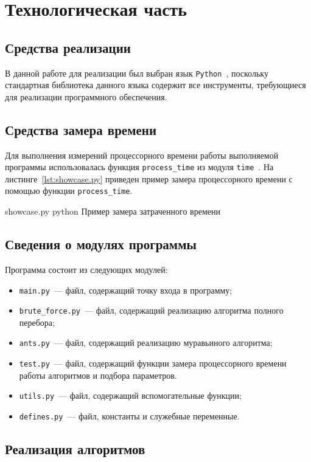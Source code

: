 \chapter{Технологическая часть}

\section{Средства реализации}

В данной работе для реализации был выбран язык \texttt{Python}~\cite{python-lang}, поскольку стандартная библиотека данного языка содержит все инструменты, требующиеся для реализации программного обеспечения.

\section{Средства замера времени}

Для выполнения измерений процессорного времени работы выполняемой программы использовалась функция \texttt{process\_time} из модуля \texttt{time}~\cite{python-lang-time}.
На листинге~\ref{lst:showcase.py} приведен пример замера процессорного времени с помощью функции \texttt{process\_time}.

{showcase.py}
{python}
{Пример замера затраченного времени}

\section{Сведения о модулях программы}

Программа состоит из следующих модулей:
\begin{itemize}
	\item \texttt{main.py}~--- файл, содержащий точку входа в программу;
	\item \texttt{brute\_force.py}~--- файл, содержащий реализацию алгоритма полного перебора;
	\item \texttt{ants.py}~--- файл, содержащий реализацию муравьиного алгоритма;
	\item \texttt{test.py}~--- файл, содержащий функции замера процессорного времени работы алгоритмов и подбора параметров.
	\item \texttt{utils.py}~--- файл, содержащий вспомогательные функции;
	\item \texttt{defines.py}~--- файл, константы и служебные переменные.
\end{itemize}

\section{Реализация алгоритмов}

